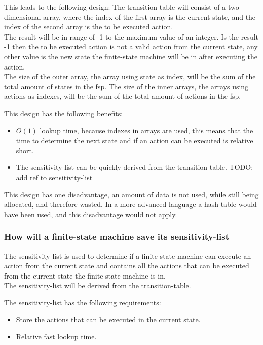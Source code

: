This leads to the following design: The transition-table will consist of
a two-dimensional array, where the index of the first array is the
current state, and the index of the second array is the to be executed
action.\\
The result will be in range of -1 to the maximum value of an integer. Is
the result -1 then the to be executed action is not a valid action from
the current state, any other value is the new state the finite-state
machine will be in after executing the action.\\
The size of the outer array, the array using state as index, will be the
sum of the total amount of states in the fsp. The size of the inner
arrays, the arrays using actions as indexes, will be the sum of the
total amount of actions in the fsp.

This design has the following benefits:

\begin{itemize}
\tightlist
\item
  \(O (1)\) lookup time, because indexes in arrays are used, this means
  that the time to determine the next state and if an action can be
  executed is relative short.
\item
  The sensitivity-list can be quickly derived from the transition-table.
  TODO: add ref to sensitivity-list
\end{itemize}

This design has one disadvantage, an amount of data is not used, while
still being allocated, and therefore wasted. In a more advanced language
a hash table would have been used, and this disadvantage would not
apply.

\hypertarget{how-will-a-finite-state-machine-save-its-sensitivity-list}{%
\subsubsection{How will a finite-state machine save its
sensitivity-list}\label{how-will-a-finite-state-machine-save-its-sensitivity-list}}

The sensitivity-list is used to determine if a finite-state machine can
execute an action from the current state and contains all the actions
that can be executed from the current state the finite-state machine is
in.\\
The sensitivity-list will be derived from the transition-table.

The sensitivity-list has the following requirements:

\begin{itemize}
\tightlist
\item
  Store the actions that can be executed in the current state.
\item
  Relative fast lookup time.
\end{itemize}

